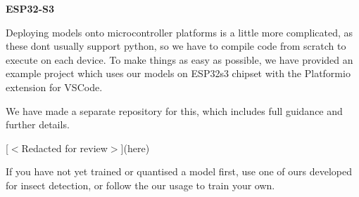 {\bfseries{ESP32-\/\+S3}}\begin{adjustwidth}{1em}{0em}


Deploying models onto microcontroller platforms is a little more complicated, as these don\textquotesingle{}t usually support python, so we have to compile code from scratch to execute on each device. To make things as easy as possible, we have provided an example project which uses our models on ESP32s3 chipset with the Platformio extension for VSCode.

We have made a separate repository for this, which includes full guidance and further details.

\mbox{[}$<$\+Redacted for review$>$\mbox{]}(here)

\end{adjustwidth}


If you have not yet trained or quantised a model first, use one of ours developed for insect detection, or follow the our usage  to train your own. 